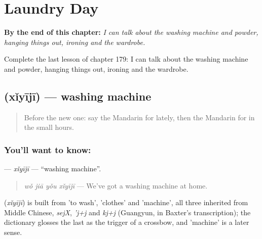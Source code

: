 
\chapter{Laundry Day}
\label{ch:zh-laundry-day}

\begin{chapteropening}
\textbf{By the end of this chapter:} \emph{I can talk about the washing machine and powder, hanging things out, ironing and the wardrobe.}

Complete the last lesson of chapter 179: I can talk about the washing machine and powder, hanging things out, ironing and the wardrobe.
\end{chapteropening}

\section[\texorpdfstring{\zh{洗衣机} (xǐyījī)}{洗衣机 (xǐyījī)}]{ (xǐyījī) — washing machine}

\label{lesson:ZH-C179-xiyiji}



\begin{quote}
Before the new one: say the Mandarin for lately, then the Mandarin for in the small hours.
\end{quote}

\subsection*{You'll want to know: }
\textbf{} — \emph{xǐyījī} — \textquotedblleft{}washing machine\textquotedblright{}.

\begin{quote}
\textbf{} \emph{wǒ jiā yǒu xǐyījī} — We've got a washing machine at home.
\end{quote}

\begin{cousinweb}
\textbf{} (\emph{xǐyījī}) is built from  'to wash',  'clothes' and  'machine', all three inherited from Middle Chinese, \emph{sejX}, \emph{'j+j} and \emph{kj+j} (Guangyun, in Baxter's transcription); the dictionary glosses the last as the trigger of a crossbow, and 'machine' is a later sense.
\end{cousinweb}

